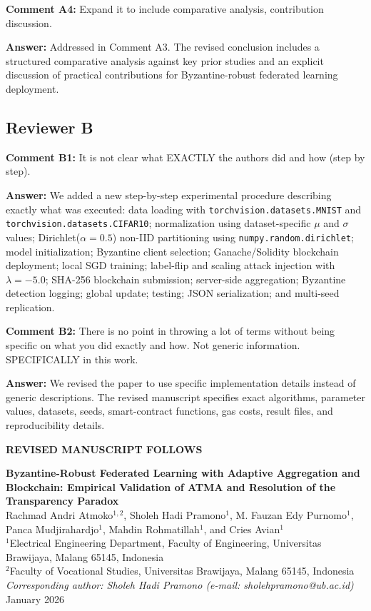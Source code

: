 \documentclass[12pt,a4paper,onecolumn]{article}
\begin{document}
\textbf{Comment A4:} Expand it to include comparative analysis, contribution discussion.

\textbf{Answer:} Addressed in Comment A3. The revised conclusion includes a structured comparative analysis against key prior studies and an explicit discussion of practical contributions for Byzantine-robust federated learning deployment.

\subsection*{Reviewer B}
\textbf{Comment B1:} It is not clear what EXACTLY the authors did and how (step by step).

\textbf{Answer:} We added a new step-by-step experimental procedure describing exactly what was executed: data loading with \texttt{torchvision.datasets.MNIST} and \texttt{torchvision.datasets.CIFAR10}; normalization using dataset-specific $\mu$ and $\sigma$ values; Dirichlet($\alpha=0.5$) non-IID partitioning using \texttt{numpy.random.dirichlet}; model initialization; Byzantine client selection; Ganache/Solidity blockchain deployment; local SGD training; label-flip and scaling attack injection with $\lambda=-5.0$; SHA-256 blockchain submission; server-side aggregation; Byzantine detection logging; global update; testing; JSON serialization; and multi-seed replication.

\textbf{Comment B2:} There is no point in throwing a lot of terms without being specific on what you did exactly and how. Not generic information. SPECIFICALLY in this work.

\textbf{Answer:} We revised the paper to use specific implementation details instead of generic descriptions. The revised manuscript specifies exact algorithms, parameter values, datasets, seeds, smart-contract functions, gas costs, result files, and reproducibility details.

\begin{center}\textbf{REVISED MANUSCRIPT FOLLOWS}\end{center}


\begin{center}
{\LARGE\textbf{Byzantine-Robust Federated Learning with Adaptive Aggregation and Blockchain: Empirical Validation of ATMA and Resolution of the Transparency Paradox}}\\[12pt]
Rachmad Andri Atmoko$^{1,2}$, Sholeh Hadi Pramono$^{1}$, M. Fauzan Edy Purnomo$^{1}$, Panca Mudjirahardjo$^{1}$, Mahdin Rohmatillah$^{1}$, and Cries Avian$^{1}$\\[10pt]
$^{1}$Electrical Engineering Department, Faculty of Engineering, Universitas Brawijaya, Malang 65145, Indonesia\\
$^{2}$Faculty of Vocational Studies, Universitas Brawijaya, Malang 65145, Indonesia\\[5pt]
\textit{Corresponding author: Sholeh Hadi Pramono (e-mail: sholehpramono@ub.ac.id)}\\[8pt]
January 2026
\end{center}
\end{document}
